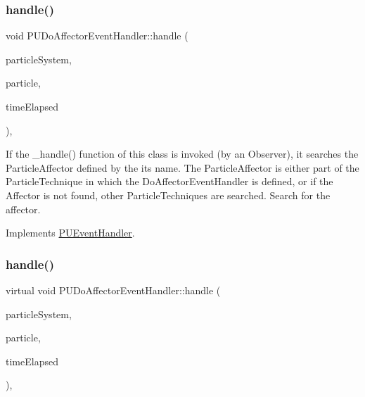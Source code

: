 \subsubsection{\texorpdfstring{handle()}{handle()}\hspace{0.1cm}{\footnotesize\ttfamily [1/2]}}
{\footnotesize\ttfamily void P\+U\+Do\+Affector\+Event\+Handler\+::handle (\begin{DoxyParamCaption}\item[{\hyperlink{classPUParticleSystem3D}{P\+U\+Particle\+System3D} $\ast$}]{particle\+System,  }\item[{\hyperlink{structPUParticle3D}{P\+U\+Particle3D} $\ast$}]{particle,  }\item[{float}]{time\+Elapsed }\end{DoxyParamCaption})\hspace{0.3cm}{\ttfamily [override]}, {\ttfamily [virtual]}}

If the \+\_\+handle() function of this class is invoked (by an Observer), it searches the Particle\+Affector defined by the its name. The Particle\+Affector is either part of the Particle\+Technique in which the Do\+Affector\+Event\+Handler is defined, or if the Affector is not found, other Particle\+Techniques are searched. Search for the affector.

Implements \hyperlink{classPUEventHandler_a760172609708c65548dcac364c9b3b9c}{P\+U\+Event\+Handler}.

\mbox{\label{classPUDoAffectorEventHandler_a73dcf140c4011202233774858c1b6e02}} 
\subsubsection{\texorpdfstring{handle()}{handle()}\hspace{0.1cm}{\footnotesize\ttfamily [2/2]}}
{\footnotesize\ttfamily virtual void P\+U\+Do\+Affector\+Event\+Handler\+::handle (\begin{DoxyParamCaption}\item[{\hyperlink{classPUParticleSystem3D}{P\+U\+Particle\+System3D} $\ast$}]{particle\+System,  }\item[{\hyperlink{structPUParticle3D}{P\+U\+Particle3D} $\ast$}]{particle,  }\item[{float}]{time\+Elapsed }\end{DoxyParamCaption})\hspace{0.3cm}{\ttfamily [override]}, {\ttfamily [virtual]}}


